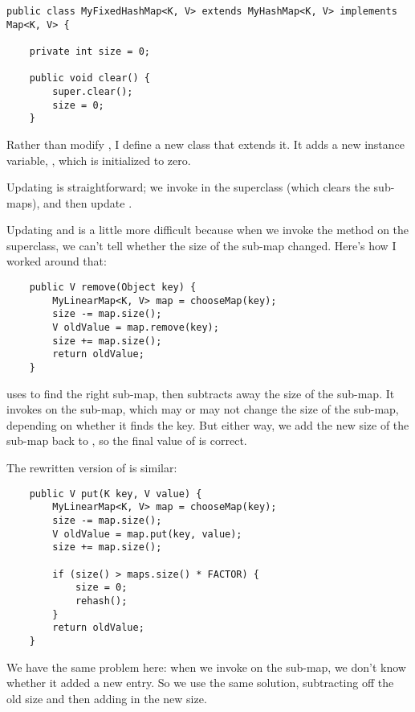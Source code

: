 \documentclass[12pt]{book}
\theoremstyle{exercise}
\begin{document}
\begin{verbatim}
public class MyFixedHashMap<K, V> extends MyHashMap<K, V> implements Map<K, V> {

    private int size = 0;

    public void clear() {
        super.clear();
        size = 0;
    }
\end{verbatim}

Rather than modify , I define a new class that
extends it. It adds a new instance variable, , which is
initialized to zero.

Updating  is straightforward; we invoke  in
the superclass (which clears the sub-maps), and then update
.


Updating  and  is a little more difficult
because when we invoke the method on the superclass, we can't tell
whether the size of the sub-map changed. Here's how I worked around
that:

\begin{verbatim}
    public V remove(Object key) {
        MyLinearMap<K, V> map = chooseMap(key);
        size -= map.size();
        V oldValue = map.remove(key);
        size += map.size();
        return oldValue;
    }
\end{verbatim}

 uses  to find the right sub-map, then
subtracts away the size of the sub-map. It invokes  on
the sub-map, which may or may not change the size of the sub-map,
depending on whether it finds the key. But either way, we add the new
size of the sub-map back to , so the final value of
 is correct.


The rewritten version of  is similar:

\begin{verbatim}
    public V put(K key, V value) {
        MyLinearMap<K, V> map = chooseMap(key);
        size -= map.size();
        V oldValue = map.put(key, value);
        size += map.size();

        if (size() > maps.size() * FACTOR) {
            size = 0;
            rehash();
        }
        return oldValue;
    }
\end{verbatim}

We have the same problem here: when we invoke  on the
sub-map, we don't know whether it added a new entry. So we use the same
solution, subtracting off the old size and then adding in the new size.
\end{document}
